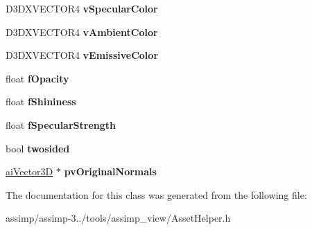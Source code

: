 \begin{DoxyCompactItemize}
\item 
\hypertarget{class_asset_helper_1_1_mesh_helper_acb0aace21741b71ea2fa3cd69f255fac}{D3\+D\+X\+V\+E\+C\+T\+O\+R4 {\bfseries v\+Specular\+Color}}\label{class_asset_helper_1_1_mesh_helper_acb0aace21741b71ea2fa3cd69f255fac}

\item 
\hypertarget{class_asset_helper_1_1_mesh_helper_a54e84a4339701ea229b27c7f2c9f335a}{D3\+D\+X\+V\+E\+C\+T\+O\+R4 {\bfseries v\+Ambient\+Color}}\label{class_asset_helper_1_1_mesh_helper_a54e84a4339701ea229b27c7f2c9f335a}

\item 
\hypertarget{class_asset_helper_1_1_mesh_helper_a3d70b525dd65df6266719fdfa9bd637a}{D3\+D\+X\+V\+E\+C\+T\+O\+R4 {\bfseries v\+Emissive\+Color}}\label{class_asset_helper_1_1_mesh_helper_a3d70b525dd65df6266719fdfa9bd637a}

\item 
\hypertarget{class_asset_helper_1_1_mesh_helper_abc92347c19a66704e28e878ac0875801}{float {\bfseries f\+Opacity}}\label{class_asset_helper_1_1_mesh_helper_abc92347c19a66704e28e878ac0875801}

\item 
\hypertarget{class_asset_helper_1_1_mesh_helper_afa15d9d8265395aac6dd81af4f5684ad}{float {\bfseries f\+Shininess}}\label{class_asset_helper_1_1_mesh_helper_afa15d9d8265395aac6dd81af4f5684ad}

\item 
\hypertarget{class_asset_helper_1_1_mesh_helper_a1a413a03c661f91b35f1225c38a52670}{float {\bfseries f\+Specular\+Strength}}\label{class_asset_helper_1_1_mesh_helper_a1a413a03c661f91b35f1225c38a52670}

\item 
\hypertarget{class_asset_helper_1_1_mesh_helper_a98e6de9f030439382f7d3df456ce4e3b}{bool {\bfseries twosided}}\label{class_asset_helper_1_1_mesh_helper_a98e6de9f030439382f7d3df456ce4e3b}

\item 
\hypertarget{class_asset_helper_1_1_mesh_helper_a4d9ccb376aba77a3a6f6b9a1b5f1d93c}{\hyperlink{structai_vector3_d}{ai\+Vector3\+D} $\ast$ {\bfseries pv\+Original\+Normals}}\label{class_asset_helper_1_1_mesh_helper_a4d9ccb376aba77a3a6f6b9a1b5f1d93c}

\end{DoxyCompactItemize}


The documentation for this class was generated from the following file\+:\begin{DoxyCompactItemize}
\item 
assimp/assimp-\/3../tools/assimp\+\_\+view/Asset\+Helper.\+h\end{DoxyCompactItemize}
